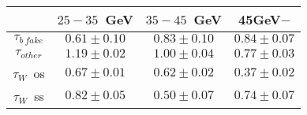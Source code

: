 \centering
\begin{tabular}{|c|c|c|c|} \hline
 & $25-35$~GeV & $35-45$~GeV & 45GeV$-$\\\hline
$\tau_{b~fake}$ & $0.61\pm0.10$ & $0.83\pm0.10$ & $0.84\pm0.07$\\\hline
$\tau_{other}$ & $1.19\pm0.02$ & $1.00\pm0.04$ & $0.77\pm0.03$\\\hline
$\tau_{W}$~os & $0.67\pm0.01$ & $0.62\pm0.02$ & $0.37\pm0.02$\\\hline
$\tau_{W}$~ss & $0.82\pm0.05$ & $0.50\pm0.07$ & $0.74\pm0.07$\\\hline
\end{tabular}
